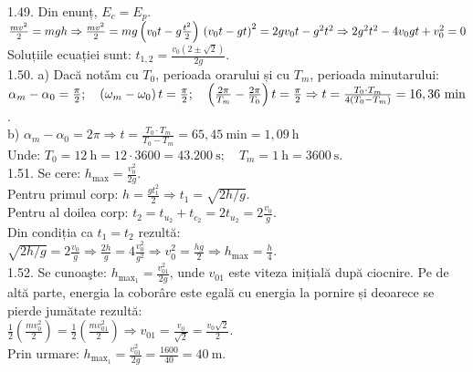 1.49. Din enunț, $E_{c}=E_{p}$.\\ $\frac{m v^{2}}{2}=m g h \Rightarrow \frac{m v^{2}}{2}=m g\left(v_{0} t-g \frac{t^{2}}{2}\right)\\ \left(v_{0} t-g t\right)^{2}=2 g v_{0} t-g^{2} t^{2} \Rightarrow 2 g^{2} t^{2}-4 v_{0} g t+v_{0}^{2}=0$\\ Soluțiile ecuației sunt: $t_{1,2}=\frac{v_{0}(2 \pm \sqrt{2})}{2 g}$.\\

1.50. a) Dacă notǎm cu $T_{0}$, perioada orarului și cu $T_{m}$, perioada minutarului:\\ $\alpha_{m}-\alpha_{0}=\frac{\pi}{2}; \quad\left(\omega_{m}-\omega_{0}\right) t=\frac{\pi}{2}; \quad\left(\frac{2 \pi}{T_{m}}-\frac{2 \pi}{T_{0}}\right) t=\frac{\pi}{2} \\\Rightarrow t=\frac{T_{0} \cdot T_{m}}{4\left(T_{0}-T_{m}\right)}=16,36 \mathrm{~min}$.\\ b) $\alpha_{m}-\alpha_{0}=2 \pi \Rightarrow t=\frac{T_{0} \cdot T_{m}}{T_{0}-T_{m}}=65,45 \mathrm{~min}=1,09 \mathrm{~h}$\\ Unde: $T_{0}=12 \mathrm{~h}=12 \cdot 3600=43.200 \mathrm{~s}; \quad T_{m}=1 \mathrm{~h}=3600 \mathrm{~s}$.\\

1.51. Se cere: $h_{\max }=\frac{v_{0}^{2}}{2 g}$.\\ Pentru primul corp: $h=\frac{g t_{1}^{2}}{2} \Rightarrow t_{1}=\sqrt{2 h / g}$.\\ Pentru al doilea corp: $t_{2}=t_{u_{2}}+t_{c_{2}}=2 t_{u_{2}}=2 \frac{v_{0}}{g}$.\\ Din condiția ca $t_{1}=t_{2}$ rezultă:\\ $\sqrt{2 h / g}=2 \frac{v_{0}}{g} \Rightarrow \frac{2 h}{g}=4 \frac{v_{0}^{2}}{g^{2}} \Rightarrow v_{0}^{2}=\frac{h g}{2} \Rightarrow h_{\max }=\frac{h}{4}$.\\

1.52. Se cunoaşte: $h_{\text {max}_{1}}=\frac{v_{01}^{2}}{2 g}$, unde $v_{01}$ este viteza inițială după ciocnire. Pe de altă parte, energia la coborâre este egală cu energia la pornire și deoarece se pierde jumătate rezultă:\\ $\frac{1}{2}\left(\frac{m v_{0}^{2}}{2}\right)=\frac{1}{2}\left(\frac{m v_{01}^{2}}{2}\right) \Rightarrow v_{01}=\frac{v_{0}}{\sqrt{2}}=\frac{v_{0} \sqrt{2}}{2}$.\\ Prin urmare: $h_{\max _{1}}=\frac{v_{01}^{2}}{2 g}=\frac{1600}{40}=40 \mathrm{~m}$.\\

